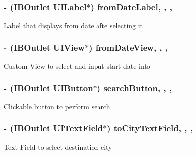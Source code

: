 \subsubsection[{\texorpdfstring{from\+Date\+Label}{fromDateLabel}}]{\setlength{\rightskip}{0pt plus 5cm}-\/ (I\+B\+Outlet U\+I\+Label$\ast$) from\+Date\+Label\hspace{0.3cm}{\ttfamily [read]}, {\ttfamily [write]}, {\ttfamily [nonatomic]}, {\ttfamily [retain]}}\hypertarget{interface_view_controller_a36237f88105eb0a69f4fb6c88ad93b7f}{}\label{interface_view_controller_a36237f88105eb0a69f4fb6c88ad93b7f}
Label that displays from date afte selecting it 
\subsubsection[{\texorpdfstring{from\+Date\+View}{fromDateView}}]{\setlength{\rightskip}{0pt plus 5cm}-\/ (I\+B\+Outlet U\+I\+View$\ast$) from\+Date\+View\hspace{0.3cm}{\ttfamily [read]}, {\ttfamily [write]}, {\ttfamily [nonatomic]}, {\ttfamily [retain]}}\hypertarget{interface_view_controller_a3b8fc21287994bc41b40b0ab0f2ca77c}{}\label{interface_view_controller_a3b8fc21287994bc41b40b0ab0f2ca77c}
Custom View to select and input start date into 
\subsubsection[{\texorpdfstring{search\+Button}{searchButton}}]{\setlength{\rightskip}{0pt plus 5cm}-\/ (I\+B\+Outlet U\+I\+Button$\ast$) search\+Button\hspace{0.3cm}{\ttfamily [read]}, {\ttfamily [write]}, {\ttfamily [nonatomic]}, {\ttfamily [retain]}}\hypertarget{interface_view_controller_a1b7e8efca17cd5dea7a58a1edbcaf79a}{}\label{interface_view_controller_a1b7e8efca17cd5dea7a58a1edbcaf79a}
Clickable button to perform search 
\subsubsection[{\texorpdfstring{to\+City\+Text\+Field}{toCityTextField}}]{\setlength{\rightskip}{0pt plus 5cm}-\/ (I\+B\+Outlet U\+I\+Text\+Field$\ast$) to\+City\+Text\+Field\hspace{0.3cm}{\ttfamily [read]}, {\ttfamily [write]}, {\ttfamily [nonatomic]}, {\ttfamily [retain]}}\hypertarget{interface_view_controller_ac80245cf28aabc624d841124b62976e5}{}\label{interface_view_controller_ac80245cf28aabc624d841124b62976e5}
Text Field to select destination city 
